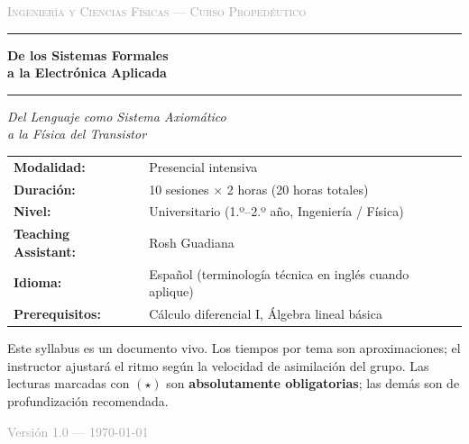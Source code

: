 \documentclass[11pt, letterpaper]{article}
\begin{document}
\begin{titlepage}
\begin{center}

\vspace*{1.2cm}

{\footnotesize\textsc{\textcolor{darkgray}{Ingeniería y Ciencias Físicas — Curso Propedéutico}}}

\vspace{0.5cm}
\textcolor{mitred}{\rule{\linewidth}{1.2pt}}
\vspace{0.4cm}

{\LARGE\bfseries De los Sistemas Formales\\[0.3em]
a la Electrónica Aplicada}

\vspace{0.3cm}
\textcolor{mitred}{\rule{\linewidth}{1.2pt}}

\vspace{1.0cm}

{\large\itshape Del Lenguaje como Sistema Axiomático\\
a la Física del Transistor}

\vspace{1.8cm}

\begin{tabular}{ll}
\textbf{Modalidad:}        & Presencial intensiva \\[3pt]
\textbf{Duración:}         & 10 sesiones $\times$ 2 horas (20 horas totales) \\[3pt]
\textbf{Nivel:}            & Universitario (1.º–2.º año, Ingeniería / Física) \\[3pt]
\textbf{Teaching Assistant:} & Rosh Guadiana \\[3pt]
\textbf{Idioma:}           & Español (terminología técnica en inglés cuando aplique) \\[3pt]
\textbf{Prerequisitos:}    & Cálculo diferencial I, Álgebra lineal básica \\
\end{tabular}

\vspace{2.0cm}

\begin{nota}
Este syllabus es un documento vivo. Los tiempos por tema son aproximaciones;
el instructor ajustará el ritmo según la velocidad de asimilación del grupo.
Las lecturas marcadas con $(\star)$ son \textbf{absolutamente obligatorias};
las demás son de profundización recomendada.
\end{nota}

\vfill

{\small\textcolor{darkgray}{Versión 1.0 — \today}}

\end{center}
\end{titlepage}
\end{document}
